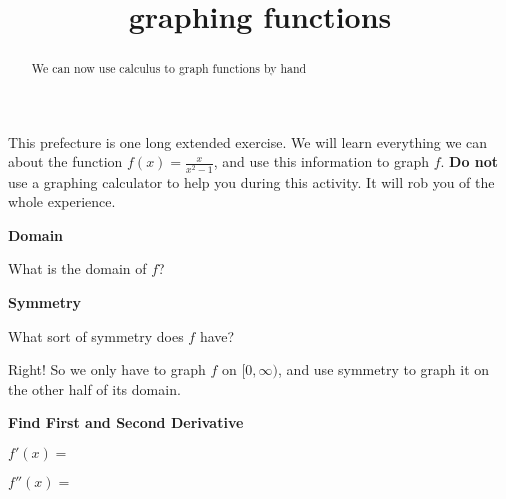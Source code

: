 \documentclass{ximera}
\title{graphing functions}
\begin{document}
\begin{abstract}
  We can now use calculus to graph functions by hand
\end{abstract}

\maketitle


This prefecture is one long extended exercise.  We will learn everything we can about the function $f(x) = \frac{x}{x^2-1}$, and use this information to graph $f$.
\textbf{Do not} use a graphing calculator to help you during this activity.  It will rob you of the whole experience.

\begin{question}

\textbf{Domain}

\begin{solution}
What is the domain of $f$?
 
    \begin{multipleChoice}
    \end{multipleChoice}
    
\end{solution}    

\textbf{Symmetry}

\begin{solution}
   What sort of symmetry does $f$ have?
   
    \begin{multipleChoice}
    \end{multipleChoice}

\end{solution}    

    Right!  So we only have to graph $f$ on $[0,\infty)$, and use symmetry to graph it on the other half of its domain.
    
 \textbf{Find First and Second Derivative}
 
 \begin{solution}
 	$f'(x)=$
 \end{solution}
 
 \begin{solution}
 	$f''(x)=$
 \end{solution}
 

\end{question}
\end{document}
